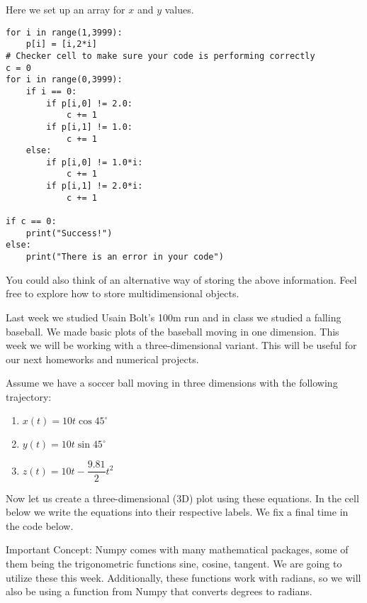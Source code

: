 \documentclass[%
oneside,                 %
final,                   %
10pt]{article}
\begin{document}
Here we set up an array for $x$ and $y$ values. 
\begin{verbatim}
for i in range(1,3999):
    p[i] = [i,2*i]
# Checker cell to make sure your code is performing correctly
c = 0
for i in range(0,3999):
    if i == 0:
        if p[i,0] != 2.0:
            c += 1
        if p[i,1] != 1.0:
            c += 1
    else:
        if p[i,0] != 1.0*i:
            c += 1
        if p[i,1] != 2.0*i:
            c += 1

if c == 0:
    print("Success!")
else:
    print("There is an error in your code")
\end{verbatim}

You could also think of an alternative way of storing the above information. Feel free to explore how to store
multidimensional objects. 


Last week we studied Usain Bolt's 100m run and in class we studied a falling baseball. We made basic plots of the baseball
moving in one dimension. This week we will be working with a three-dimensional variant. This will be useful for our next homeworks and numerical projects. 

Assume we have a soccer ball moving in three dimensions with the following trajectory:

\begin{enumerate}
\item $x(t) = 10t\cos{45^{\circ}} $

\item $y(t) = 10t\sin{45^{\circ}} $

\item $z(t) = 10t - \dfrac{9.81}{2}t^2$
\end{enumerate}

\noindent
Now let us create a three-dimensional (3D) plot using these equations. In the cell below
we write the equations into their respective labels. We fix a final time in the code below.

Important Concept: Numpy comes with many mathematical packages, some
of them being the trigonometric functions sine, cosine, tangent. We
are going to utilize these this week. Additionally, these functions
work with radians, so we will also be using a function from Numpy that
converts degrees to radians.
\end{document}
